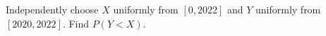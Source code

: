 Independently choose $X$ uniformly from $[0,2022]$ and $Y$ uniformly from $[2020,2022]$. Find $P(Y<X)$.
